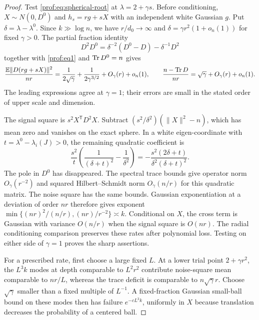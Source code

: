 \begin{proof}
Test \eqref{prof:eq:spherical-root} at $\lambda=2+\gamma s$.
Before conditioning, $X\sim N(0,D^0)$ and $h_s=rg+sX$ with an
independent white Gaussian $g$. Put $\delta=\lambda-\lambda^0$.
Since $k\gg\log n$, we have $r/d_0\to\infty$ and
$\delta=\gamma r^2(1+o_n(1))$ for fixed $\gamma>0$.
The partial fraction identity
\[
 D^2D^0=\delta^{-2}(D^0-D)-\delta^{-1}D^2
\]
together with \eqref{prof:eq1} and $\operatorname{Tr} D^0=n$ gives
\[
 \frac{\mathbb E\|D(rg+sX)\|^2}{nr}
 =\frac1{2\sqrt\gamma}+\frac1{2\gamma^{3/2}}
   +O_\gamma(r)+o_n(1),
 \qquad
 \frac{n-\operatorname{Tr} D}{nr}=\sqrt\gamma+O_\gamma(r)+o_n(1).
\]
The leading expressions agree at $\gamma=1$; their errors are small
in the stated order of upper scale and dimension.

The signal square is $s^2X^{\mathsf T}D^2X$. Subtract
$(s^2/\delta^2)(\|X\|^2-n)$, which has mean zero and vanishes on the
exact sphere. In a white eigen-coordinate with
$t=\lambda^0-\lambda_i(J)>0$, the remaining quadratic coefficient is
\[
 \frac{s^2}{t}\left(\frac1{(\delta+t)^2}-\frac1{\delta^2}\right)
 =-\frac{s^2(2\delta+t)}{\delta^2(\delta+t)^2}.
\]
The pole in $D^0$ has disappeared. The spectral trace bounds give
operator norm $O_\gamma(r^{-2})$ and squared Hilbert--Schmidt norm
$O_\gamma(n/r)$ for this quadratic matrix. The noise square has the
same bounds. Gaussian exponentiation at a deviation of order $nr$
therefore gives exponent
$\min\{(nr)^2/(n/r),(nr)/r^{-2}\}\asymp k$.
Conditional on $X$, the cross term is Gaussian with variance
$O(n/r)$ when the signal square is $O(nr)$. The radial conditioning
comparison preserves these rates after polynomial loss.
Testing on either side of $\gamma=1$ proves the sharp assertions.

For a prescribed rate, first choose a large fixed $L$. At a lower
trial point $2+\gamma r^2$, the $L^3k$ modes at depth comparable to
$L^2r^2$ contribute noise-square mean comparable to $nr/L$, whereas
the trace deficit is comparable to $n\sqrt\gamma r$. Choose
$\sqrt\gamma$ smaller than a fixed multiple of $L^{-1}$. A
fixed-fraction Gaussian small-ball bound on these modes then has
failure $e^{-cL^3k}$, uniformly in $X$ because translation decreases
the probability of a centered ball.


\end{proof}

